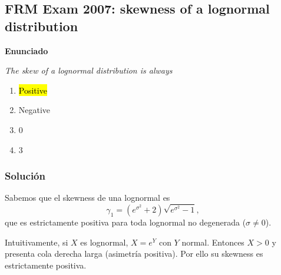 ﻿\subsection{FRM Exam 2007: skewness of a lognormal distribution}

\textbf{Enunciado}

\emph{The skew of a lognormal distribution is always}
\begin{enumerate}[label=\alph*.]
\item \hl{Positive}
\item Negative
\item 0
\item 3
\end{enumerate}

\subsubsection*{Solución}

Sabemos que el skewness de una lognormal es
\[
\gamma_1=(e^{\sigma^2}+2)\sqrt{e^{\sigma^2}-1},
\]
que es estrictamente positiva para toda lognormal no degenerada (\(\sigma \neq 0\)).

Intuitivamente, si \(X\) es lognormal, \(X=e^{Y}\) con \(Y\) normal. Entonces \(X>0\) y presenta cola derecha larga (asimetría positiva). Por ello su skewness es estrictamente positiva.
